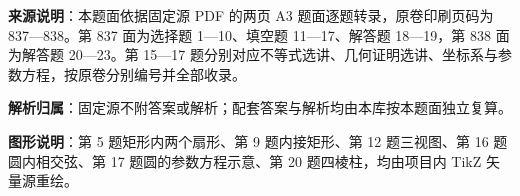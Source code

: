 

\begin{gknotice}
\textbf{来源说明}：本题面依据固定源 PDF 的两页 A3 题面逐题转录，原卷印刷页码为 837—838。第 837 面为选择题 1—10、填空题 11—17、解答题 18—19，第 838 面为解答题 20—23。第 15—17 题分别对应不等式选讲、几何证明选讲、坐标系与参数方程，按原卷分别编号并全部收录。

\textbf{解析归属}：固定源不附答案或解析；配套答案与解析均由本库按本题面独立复算。

\textbf{图形说明}：第 5 题矩形内两个扇形、第 9 题内接矩形、第 12 题三视图、第 16 题圆内相交弦、第 17 题圆的参数方程示意、第 20 题四棱柱，均由项目内 TikZ 矢量源重绘。
\end{gknotice}


